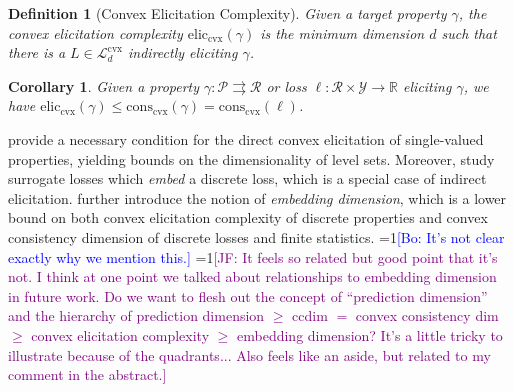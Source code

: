 \documentclass[11pt]{article} %
\newcommand{\Comments}{1}
\newcommand{\mynote}[2]{\ifnum\Comments=1\textcolor{#1}{#2}\fi}
\newcommand{\jessie}[1]{\mynote{purple}{[JF: #1]}}
\newcommand{\bo}[1]{\mynote{blue}{[Bo: #1]}}
\newcommand{\reals}{\mathbb{R}}
\newcommand{\eliccvx}{\mathrm{elic}_\mathrm{cvx}}
\newcommand{\conscvx}{\mathrm{cons}_\mathrm{cvx}}
\newcommand{\Lcvx}{\mathcal{L}^{\mathrm{cvx}}}
\newcommand{\R}{\mathcal{R}}
\renewcommand{\P}{\mathcal{P}}
\newcommand{\Y}{\mathcal{Y}}
\newcommand{\toto}{\rightrightarrows}
\newtheorem{corollary}{Corollary}
\newtheorem{definition}{Definition}
\begin{document}
\begin{definition}[Convex Elicitation Complexity]\label{def:cvx-elic-complex}
	Given a target property $\gamma$, the \emph{convex elicitation complexity} $\eliccvx(\gamma)$ is the minimum dimension $d$ such that there is a $L \in \Lcvx_d$ indirectly eliciting $\gamma$.
\end{definition}

\begin{corollary}\label{cor:elic-lb-consis-dim}
	Given a property $\gamma : \P \toto \R$ or loss $\ell:\R \times \Y \to \reals$ eliciting $\gamma$, we have $\eliccvx(\gamma) \leq \conscvx(\gamma) = \conscvx(\ell)$.
\end{corollary}


\citet[Corollary 10]{agarwal2015consistent} provide a necessary condition for the direct convex elicitation of single-valued properties, yielding bounds on the dimensionality of level sets.
Moreover, \citet{finocchiaro2019embedding} study surrogate losses which \emph{embed} a discrete loss, which is a special case of indirect elicitation.
\citet{finocchiaro2020embedding} further introduce the notion of \emph{embedding dimension}, which is a lower bound on both convex elicitation complexity of discrete properties and convex consistency dimension of discrete losses and finite statistics.
\bo{It's not clear exactly why we mention this.} \jessie{It feels so related but good point that it's not.  I think at one point we talked about relationships to embedding dimension in future work.  Do we want to flesh out the concept of ``prediction dimension'' and the hierarchy of prediction dimension $\geq$ ccdim $=$ convex consistency dim $\geq$ convex elicitation complexity $\geq$ embedding dimension?  It's a little tricky to illustrate because of the quadrants... Also feels like an aside, but related to my comment in the abstract.}
\end{document}

